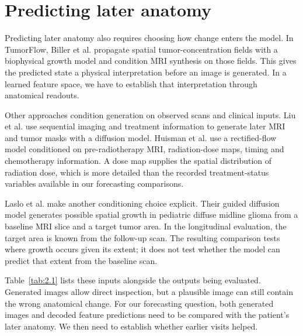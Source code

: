 \section{Predicting later anatomy}

Predicting later anatomy also requires choosing how change enters the model. In TumorFlow, Biller et al. \cite{ref6} propagate spatial tumor-concentration fields with a biophysical growth model and condition MRI synthesis on those fields. This gives the predicted state a physical interpretation before an image is generated. In a learned feature space, we have to establish that interpretation through anatomical readouts.

Other approaches condition generation on observed scans and clinical inputs. Liu et al. \cite{ref7} use sequential imaging and treatment information to generate later MRI and tumor masks with a diffusion model. Huisman et al. \cite{ref9} use a rectified-flow model conditioned on pre-radiotherapy MRI, radiation-dose maps, timing and chemotherapy information. A dose map supplies the spatial distribution of radiation dose, which is more detailed than the recorded treatment-status variables available in our forecasting comparisons.

Laslo et al. \cite{ref8} make another conditioning choice explicit. Their guided diffusion model generates possible spatial growth in pediatric diffuse midline glioma from a baseline MRI slice and a target tumor area. In the longitudinal evaluation, the target area is known from the follow-up scan. The resulting comparison tests where growth occurs given its extent; it does not test whether the model can predict that extent from the baseline scan.

Table~\ref{tab:2.1} lists these inputs alongside the outputs being evaluated. Generated images allow direct inspection, but a plausible image can still contain the wrong anatomical change. For our forecasting question, both generated images and decoded feature predictions need to be compared with the patient's later anatomy. We then need to establish whether earlier visits helped.

